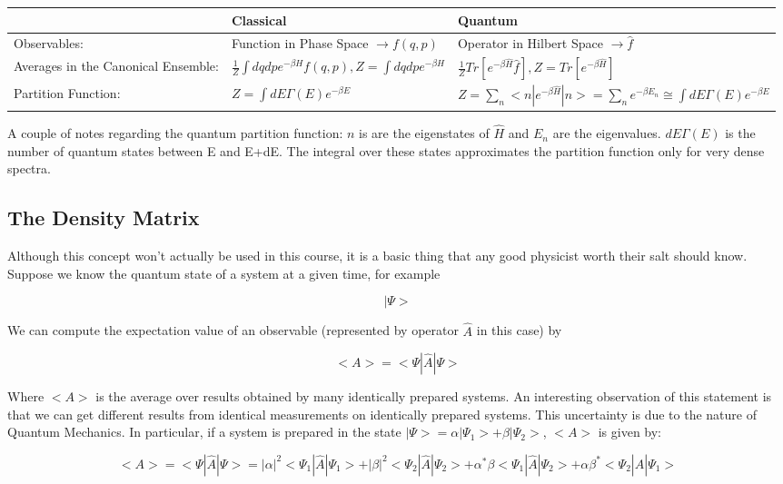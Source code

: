 \documentclass{article}
\begin{document}
\begin{tabu} to 0.8\textwidth { | X[r] | X[c] | X[c] | }
	\hline
	 & Classical & Quantum \\
	\hline
	Observables: & Function in Phase Space $\rightarrow f(q,p)$ & Operator in Hilbert Space $\rightarrow\hat{f}$ \\
	\hline
	Averages in the Canonical Ensemble: & $\frac{1}{Z}\int dqdpe^{-\beta H}f(q,p), Z=\int dqdpe^{-\beta H}$ & $\frac{1}{Z}Tr[e^{-\beta\hat{H}}\hat{f}], Z=Tr[e^{-\beta\hat{H}}]$\\
	\hline
	Partition Function: & $Z=\int dE\Gamma(E)e^{-\beta E}$ & $Z=\sum_{n}<n|e^{-\beta\hat{H}}|n>=\sum_{n}e^{-\beta E_{n}}\cong\int dE\Gamma(E)e^{-\beta E}$\\
	\hline
\end{tabu}  

A couple of notes regarding the quantum partition function: $n$ is are the eigenstates of $\hat{H}$ and $E_{n}$ are the eigenvalues.  $dE\Gamma(E)$ is the number of quantum states between E and E+dE.  The integral over these states approximates the partition function only for very dense spectra.  

\subsection{The Density Matrix}

Although this concept won't actually be used in this course, it is a basic thing that any good physicist worth their salt should know.  Suppose we know the quantum state of a system at a given time, for example

$$|\Psi>$$

We can compute the expectation value of an observable (represented by operator $\hat{A}$ in this case) by

$$<A>=<\Psi|\hat{A}|\Psi>$$

Where $<A>$ is the average over results obtained by many identically prepared systems.  An interesting observation of this statement is that we can get different results from identical measurements on identically prepared systems.  This uncertainty is due to the nature of Quantum Mechanics.  In particular, if a system is prepared in the state $|\Psi>=\alpha|\Psi_{1}>+\beta|\Psi_{2}>$, $<A>$ is given by:

$$<A>=<\Psi|\hat{A}|\Psi>=|\alpha|^{2}<\Psi_{1}|\hat{A}|\Psi_{1}>+|\beta|^{2}<\Psi_{2}|\hat{A}|\Psi_{2}>+\alpha^{*}\beta<\Psi_{1}|\hat{A}|\Psi_{2}>+\alpha\beta^{*}<\Psi_{2}|\hat{A}|\Psi_{1}>$$
\end{document}
